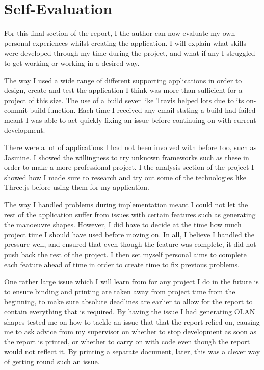 \section{Self-Evaluation}
For this final section of the report, I the author can now evaluate my own personal experiences whilst creating the application. I will explain what skills were developed through my time during the project, and what if any I struggled to get working or working in a desired way.

The way I used a wide range of different supporting applications in order to design, create and test the application I think was more than sufficient for a project of this size. The use of a build sever like Travis helped lots due to its on-commit build function. Each time I received any email stating a build had failed meant I was able to act quickly fixing an issue before continuing on with current development.

There were a lot of applications I had not been involved with before too, such as Jasmine. I showed the willingness to try unknown frameworks such as these in order to make a more professional project. I the analysis section of the project I showed how I made sure to research and try out some of the technologies like Three.js before using them for my application.

The way I handled problems during implementation meant I could not let the rest of the application suffer from issues with certain features such as generating the manoeuvre shapes. However, I did have to decide at the time how much project time I should have used before moving on. In all, I believe I handled the pressure well, and ensured that even though the feature was complete, it did not push back the rest of the project. I then set myself personal aims to complete each feature ahead of time in order to create time to fix previous problems.

One rather large issue which I will learn from for any project I do in the future is to ensure binding and printing are taken away from project time from the beginning, to make sure absolute deadlines are earlier to allow for the report to contain everything that is required. By having the issue I had generating OLAN shapes tested me on how to tackle an issue that that the report relied on, causing me to ask advice from my supervisor on whether to stop development as soon as the report is printed, or whether to carry on with code even though the report would not reflect it. By printing a separate document, later, this was a clever way of getting round such an issue.

